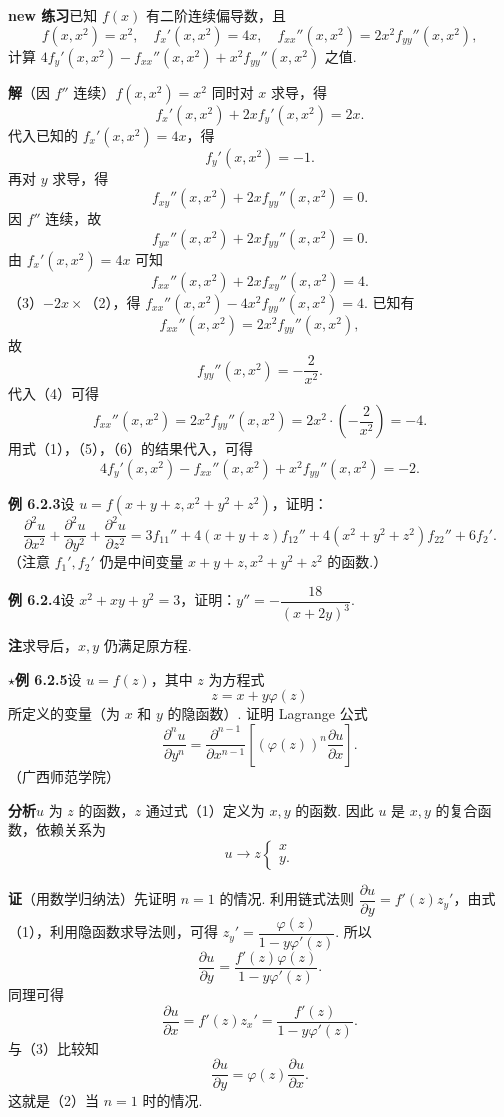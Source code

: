 \documentclass[UTF8,12pt,a4paper,fontset=fandol]{ctexart}
\begin{document}
\noindent\textbf{new 练习}\quad 已知 $f(x)$ 有二阶连续偏导数，且
\[
  f(x,x^2)=x^2,\quad f_x'(x,x^2)=4x,\quad f_{xx}''(x,x^2)=2x^2f_{yy}''(x,x^2),
\]
计算 $4f_y'(x,x^2)-f_{xx}''(x,x^2)+x^2f_{yy}''(x,x^2)$ 之值.

\noindent\textbf{解}\quad （因 $f''$ 连续）$f(x,x^2)=x^2$ 同时对 $x$ 求导，得
\[
  f_x'(x,x^2)+2xf_y'(x,x^2)=2x.
\]
代入已知的 $f_x'(x,x^2)=4x$，得
\[
  f_y'(x,x^2)=-1. \tag{1}
\]
再对 $y$ 求导，得
\[
  f_{xy}''(x,x^2)+2xf_{yy}''(x,x^2)=0. \tag{2}
\]
因 $f''$ 连续，故
\[
  f_{yx}''(x,x^2)+2xf_{yy}''(x,x^2)=0.
\]
由 $f_x'(x,x^2)=4x$ 可知
\[
  f_{xx}''(x,x^2)+2xf_{xy}''(x,x^2)=4. \tag{3}
\]
（3）$-2x\times$（2），得 $f_{xx}''(x,x^2)-4x^2f_{yy}''(x,x^2)=4$. 已知有
\[
  f_{xx}''(x,x^2)=2x^2f_{yy}''(x,x^2), \tag{4}
\]
故
\[
  f_{yy}''(x,x^2)=-\frac2{x^2}. \tag{5}
\]
代入（4）可得
\[
  f_{xx}''(x,x^2)=2x^2f_{yy}''(x,x^2)=2x^2\cdot\left(-\frac2{x^2}\right)=-4. \tag{6}
\]
用式（1），（5），（6）的结果代入，可得
\[
  4f_y'(x,x^2)-f_{xx}''(x,x^2)+x^2f_{yy}''(x,x^2)=-2.
\]

\noindent\textbf{例 6.2.3}\quad 设 $u=f(x+y+z,x^2+y^2+z^2)$，证明：
\[
  \frac{\partial^2u}{\partial x^2}+\frac{\partial^2u}{\partial y^2}+\frac{\partial^2u}{\partial z^2}
  =3f_{11}''+4(x+y+z)f_{12}''+4(x^2+y^2+z^2)f_{22}''+6f_2'.
\]
（注意 $f_1',f_2'$ 仍是中间变量 $x+y+z,x^2+y^2+z^2$ 的函数.）

\noindent\textbf{例 6.2.4}\quad 设 $x^2+xy+y^2=3$，证明：$y''=-\dfrac{18}{(x+2y)^3}$.

\noindent\textbf{注}\quad 求导后，$x,y$ 仍满足原方程.

\noindent\textbf{\ensuremath{\star}例 6.2.5}\quad 设 $u=f(z)$，其中 $z$ 为方程式
\[
  z=x+y\varphi(z) \tag{1}
\]
所定义的变量（为 $x$ 和 $y$ 的隐函数）. 证明 Lagrange 公式
\[
  \frac{\partial^nu}{\partial y^n}
  =\frac{\partial^{n-1}}{\partial x^{n-1}}\left[(\varphi(z))^n\frac{\partial u}{\partial x}\right]. \tag{2}
\]
（广西师范学院）

\noindent\textbf{分析}\quad $u$ 为 $z$ 的函数，$z$ 通过式（1）定义为 $x,y$ 的函数. 因此 $u$ 是 $x,y$ 的复合函数，依赖关系为
\[
  u\longrightarrow z\begin{cases}x\\y.\end{cases}
\]

\noindent\textbf{证}\quad （用数学归纳法）先证明 $n=1$ 的情况. 利用链式法则 $\dfrac{\partial u}{\partial y}=f'(z)z_y'$，由式（1），利用隐函数求导法则，可得 $z_y'=\dfrac{\varphi(z)}{1-y\varphi'(z)}$. 所以
\[
  \frac{\partial u}{\partial y}
  =\frac{f'(z)\varphi(z)}{1-y\varphi'(z)}. \tag{3}
\]
同理可得
\[
  \frac{\partial u}{\partial x}=f'(z)z_x'=\frac{f'(z)}{1-y\varphi'(z)}.
\]
与（3）比较知
\[
  \frac{\partial u}{\partial y}=\varphi(z)\frac{\partial u}{\partial x}. \tag{4}
\]
这就是（2）当 $n=1$ 时的情况.
\end{document}

